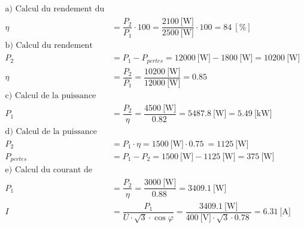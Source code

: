 \documentclass[a4paper,11pt,answers,addpoints]{exam}
\begin{document}
\begin{questions}
\begin{solution} 
	\begin{align*} 
		\text{a) Calcul du rendement du moteur :} & \\[6pt]
		\eta &= \dfrac{P_2}{P_1} \cdot 100 = \dfrac{\qty{2100}{[\watt]}}{\qty{2500}{[\watt]}} \cdot 100 = \qty{84}{[\%]} \\[6pt]
		\text{b) Calcul du rendement du transformateur :} & \\[6pt] 
		P_2 &= P_1 - P_{pertes} = \qty{12000}{[\watt]} - \qty{1800}{[\watt]} = \qty{10200}{[\watt]} \\[6pt] 
		\eta &= \dfrac{P_2}{P_1} = \dfrac{\qty{10200}{[\watt]}}{\qty{12000}{[\watt]}} = \qty{0,85}{} \\[6pt] 
		\text{c) Calcul de la puissance absorbée par la pompe :} & \\[6pt]
		P_1 &= \dfrac{P_2}{\eta} = \dfrac{\qty{4500}{[\watt]}}{\qty{0,82}{}} = \qty{5487,8}{[\watt]} = \qty{5,49}{[\kilo\watt]} \\[6pt]
		\text{d) Calcul de la puissance perdue du chauffage :} & \\[6pt]
		P_2 &= P_1 \cdot \eta = \qty{1500}{[\watt]} \cdot \qty{0,75}{} = \qty{1125}{[\watt]} \\[6pt]
		P_{pertes} &= P_1 - P_2 = \qty{1500}{[\watt]} - \qty{1125}{[\watt]} = \qty{375}{[\watt]} \\[6pt] 
		\text{e) Calcul du courant de ligne du moteur triphasé :} & \\[6pt]
		P_1 &= \dfrac{P_2}{\eta} = \dfrac{\qty{3000}{[\watt]}}{\qty{0,88}{}} = \qty{3409,1}{[\watt]}\\[6pt]
		I &= \dfrac{P_1}{U \cdot \sqrt{3} \cdot \cos \varphi} = \dfrac{\qty{3409,1}{[\watt]}}{\qty{400}{[\volt]} \cdot \sqrt{3} \cdot \qty{0,78}{}} = \qty{6,31}{[\ampere]}

\end{align*}
\end{solution}
\end{questions}
\end{document}
